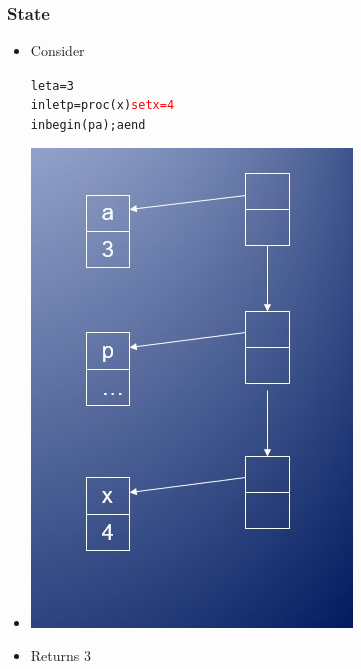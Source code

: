 \documentclass{beamer}
\begin{document}
\begin{frame}[fragile]
\frametitle{State}
\begin{scriptsize}
\begin{itemize}
\item<1-> Consider
\begin{alltt}
let a = 3
in let p = proc (x) \textcolor{red}{set x = 4}
   in begin (p a); a end
\end{alltt}

\item<1->
\begin{center}
\includegraphics[scale=0.5]{cbv4.jpg}
\end{center}

\item<1-> Returns 3

\end{itemize}
\end{scriptsize}
\end{frame}
\end{document}
